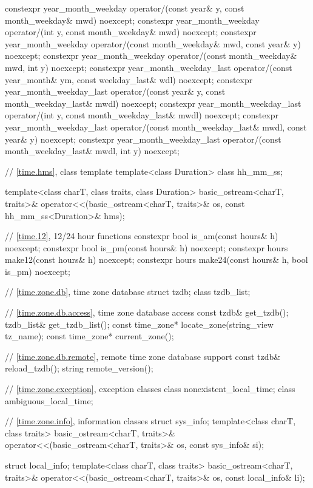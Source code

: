 \begin{codeblock}
{  constexpr year_month_weekday
    operator/(const year& y, const month_weekday& mwd) noexcept;
  constexpr year_month_weekday
    operator/(int y, const month_weekday& mwd) noexcept;
  constexpr year_month_weekday
    operator/(const month_weekday& mwd, const year& y) noexcept;
  constexpr year_month_weekday
    operator/(const month_weekday& mwd, int y) noexcept;
  constexpr year_month_weekday_last
    operator/(const year_month& ym, const weekday_last& wdl) noexcept;
  constexpr year_month_weekday_last
    operator/(const year& y, const month_weekday_last& mwdl) noexcept;
  constexpr year_month_weekday_last
    operator/(int y, const month_weekday_last& mwdl) noexcept;
  constexpr year_month_weekday_last
    operator/(const month_weekday_last& mwdl, const year& y) noexcept;
  constexpr year_month_weekday_last
    operator/(const month_weekday_last& mwdl, int y) noexcept;

  // \ref{time.hms}, class template 
  template<class Duration> class hh_mm_ss;

  template<class charT, class traits, class Duration>
    basic_ostream<charT, traits>&
      operator<<(basic_ostream<charT, traits>& os, const hh_mm_ss<Duration>& hms);

  // \ref{time.12}, 12/24 hour functions
  constexpr bool is_am(const hours& h) noexcept;
  constexpr bool is_pm(const hours& h) noexcept;
  constexpr hours make12(const hours& h) noexcept;
  constexpr hours make24(const hours& h, bool is_pm) noexcept;

  // \ref{time.zone.db}, time zone database
  struct tzdb;
  class tzdb_list;

  // \ref{time.zone.db.access}, time zone database access
  const tzdb& get_tzdb();
  tzdb_list& get_tzdb_list();
  const time_zone* locate_zone(string_view tz_name);
  const time_zone* current_zone();

  // \ref{time.zone.db.remote}, remote time zone database support
  const tzdb& reload_tzdb();
  string remote_version();

  // \ref{time.zone.exception}, exception classes
  class nonexistent_local_time;
  class ambiguous_local_time;

  // \ref{time.zone.info}, information classes
  struct sys_info;
  template<class charT, class traits>
    basic_ostream<charT, traits>&
      operator<<(basic_ostream<charT, traits>& os, const sys_info& si);

  struct local_info;
  template<class charT, class traits>
    basic_ostream<charT, traits>&
      operator<<(basic_ostream<charT, traits>& os, const local_info& li);

}
\end{codeblock}
